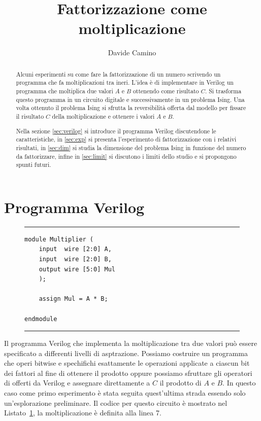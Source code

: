 \documentclass[]{article}
\title{Fattorizzazione come moltiplicazione \say{reversed}}
\author{Davide Camino}
\begin{document}
	
	\maketitle
	
	\begin{abstract}
		Alcuni esperimenti su come fare la fattorizzazione di un numero scrivendo un programma che fa moltiplicazioni tra ineri. L'idea è di implementare in Verilog un programma che moltiplica due valori $A$ e $B$ ottenendo come risultato $C$. Si trasforma questo programma in un circuito digitale e successivamente in un problema Ising. Una volta ottenuto il problema Ising si sfrutta la reversibilità offerta dal modello per fissare il risultato $C$ della moltiplicazione e ottenere i valori $A$ e $B$.
		
		Nella sezione \ref{sec:verilog} si introduce il programma Verilog discutendone le caratteristiche, in \ref{sec:exp} si presenta l'esperimento di fattorizzazione con i relativi risultati, in \ref{sec:dim} si studia la dimensione del problema Ising in funzione del numero da fattorizzare, infine in \ref{sec:limit} si discutono i limiti dello studio e si propongono spunti futuri.
	\end{abstract}			
	
	\section{Programma Verilog}
	\label{sec:verilog}
	\begin{figure}
		\rule{\linewidth}{0.4pt}
		
		\hfill
		\begin{minipage}{.9\linewidth}
			\vspace{.2cm}
			\begin{verbatim}
module Multiplier (
	input  wire [2:0] A,
	input  wire [2:0] B,
	output wire [5:0] Mul
	);
	
	assign Mul = A * B;

endmodule
			\end{verbatim}
			\vspace{-.1cm}
		\end{minipage}
		\rule{\linewidth}{0.4pt}
	\label{lst:mult_verilog}
\end{figure}
	Il programma Verilog che implementa la moltiplicazione tra due valori può essere specificato a differenti livelli di asptrazione. Possiamo costruire un programma che operi bitwise e spechifichi esattamente le operazioni applicate a ciascun bit dei fattori al fine di ottenere il prodotto oppure possiamo sfruttare gli operatori di  offerti da Verilog e assegnare direttamente a $C$ il prodotto di $A$ e $B$. In questo caso come primo esperimento è stata seguita quest'ultima strada essendo solo un'esplorazione preliminare. Il codice  per questo circuito è mostrato nel Listato~\ref{lst:mult_verilog}, la moltiplicazione è definita alla linea 7.
	
\end{document}
